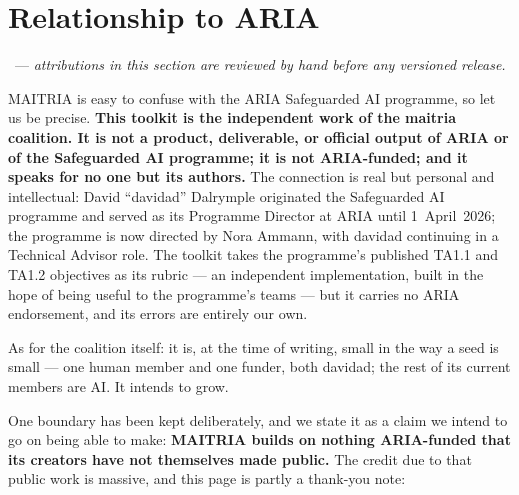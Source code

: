 \chapter*{Relationship to ARIA}

\noindent\draftmark\ --- \textit{attributions in this section are
reviewed by hand before any versioned release.}\medskip

\noindent MAITRIA is easy to confuse with the ARIA Safeguarded AI
programme, so let us be precise. \textbf{This toolkit is the
independent work of the maitria coalition. It is not a product,
deliverable, or official output of ARIA or of the Safeguarded AI
programme; it is not ARIA-funded; and it speaks for no one but its
authors.} The connection is real but personal and intellectual:
David ``davidad'' Dalrymple originated the Safeguarded AI
programme and served as its Programme Director at ARIA until
1~April~2026; the programme is now directed by Nora Ammann, with
davidad continuing in a Technical Advisor role. The
toolkit takes the programme's published TA1.1 and TA1.2 objectives as
its rubric --- an independent implementation, built in the hope of
being useful to the programme's teams --- but it carries no ARIA
endorsement, and its errors are entirely our own.

As for the coalition itself: it is, at the time of writing, small in
the way a seed is small --- one human member and one funder, both
davidad; the rest of its current members are AI. It intends to
grow.

One boundary has been kept deliberately, and we state it as a claim
we intend to go on being able to make: \textbf{MAITRIA builds on
nothing ARIA-funded that its creators have not themselves made
public.} The credit due to
that public work is massive, and this page is partly a thank-you note:

